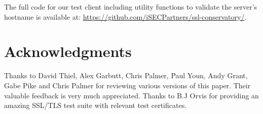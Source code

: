 \documentclass{article}
\begin{document}
The full code for our test client including utility functions to validate the
server's hostname is available at:
\url{https://github.com/iSECPartners/ssl-conservatory/}.


\section{Acknowledgments}

Thanks to David Thiel, Alex Garbutt, Chris Palmer, Paul Youn, Andy Grant, Gabe
Pike and  Chris Palmer for reviewing various versions of this paper. Their
valuable  feedback is very much appreciated. Thanks to B.J Orvis for providing
an amazing SSL/TLS test suite with relevant test certificates.

\pagebreak
\appendix

%

%
%
\end{document}
